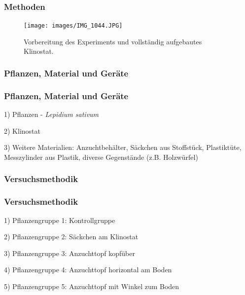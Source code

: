 \documentclass[aspectratio=169]{beamer}
\begin{document}
	\begin{frame}
		\frametitle{Methoden}
		\begin{figure}[H]
			\centering 
			\texttt{[image: images/IMG\_1044.JPG]}
			\caption{Vorbereitung des Experiments und vollständig aufgebautes Klinostat.\label{Klinostat2}}
		\end{figure}
		
	\end{frame}
	
	\subsubsection{Pflanzen, Material und Geräte}

	\begin{frame}
		\frametitle{Pflanzen, Material und Geräte}
		1) Pflanzen - \protect\emph{Lepidium sativum}
		
		2) Klinostat
		
		3) Weitere Materialien: Anzuchtbehälter, Säckchen aus Stoffstück, Plastiktüte, Messzylinder aus Plastik, diverse Gegenstände (z.B. Holzwürfel) 
	\end{frame}



	
	\subsubsection{Versuchsmethodik}
	
	\begin{frame}
		\frametitle{Versuchsmethodik}
		1) Pflanzengruppe 1: Kontrollgruppe
		
		2) Pflanzengruppe 2: Säckchen am Klinostat
		
		3) Pflanzengruppe 3: Anzuchttopf kopfüber
		
		4) Pflanzengruppe 4: Anzuchttopf horizontal am Boden
		
		5) Pflanzengruppe 5: Anzuchttopf mit Winkel zum Boden 
		
	\end{frame}
	
\end{document}
